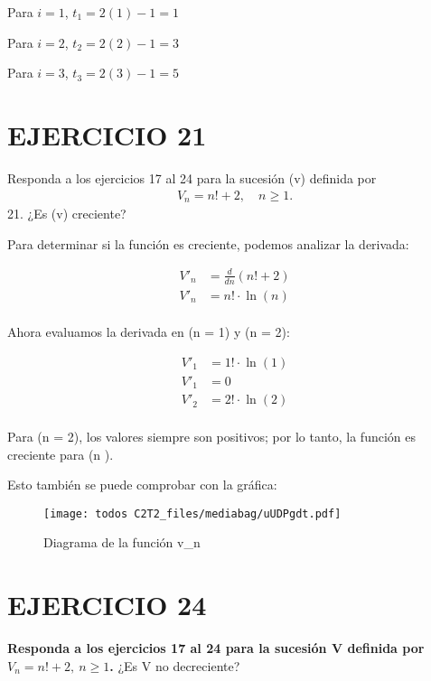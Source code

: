 \documentclass[
  letterpaper,
  DIV=11,
  numbers=noendperiod]{scrartcl}
\begin{document}
Para \(i = 1\), \(t_1 = 2(1)-1 = 1\)

Para \(i = 2\), \(t_2 = 2(2)-1 = 3\)

Para \(i = 3\), \(t_3 = 2(3)-1 = 5\)

\hypertarget{ejercicio-21}{%
\section{EJERCICIO 21}\label{ejercicio-21}}

Responda a los ejercicios 17 al 24 para la sucesión (v) definida por \[
\begin{align*}
V_n = n! + 2, \quad n \geq 1.
\end{align*}
\] 21. ¿Es (v) creciente?

Para determinar si la función es creciente, podemos analizar la
derivada:

\hfill\break
\begin{align*}
V'_n &= \frac{d}{dn} (n! + 2) \\
V'_n &= n! \cdot \ln(n)
\end{align*}\\

Ahora evaluamos la derivada en (n = 1) y (n = 2):

\hfill\break
\begin{align*}
V'_1 &= 1! \cdot \ln(1) \\
V'_1 &= 0 \\
V'_2 &= 2! \cdot \ln(2)
\end{align*}\\

Para (n = 2), los valores siempre son positivos; por lo tanto, la
función es creciente para (n ).

Esto también se puede comprobar con la gráfica:

\begin{figure}

{\centering \texttt{[image: todos C2T2\_files/mediabag/uUDPgdt.pdf]}

}

\caption{Diagrama de la función v\_n}

\end{figure}

\hypertarget{ejercicio-24}{%
\section{EJERCICIO 24}\label{ejercicio-24}}

\textbf{Responda a los ejercicios 17 al 24 para la sucesión V definida
por \(V_{n} = n! + 2, \ n \geq 1\).} ¿Es V no decreciente?
\end{document}
